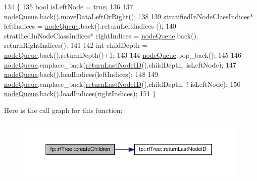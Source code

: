 \begin{DoxyCode}
134                                             \{
135                     \textcolor{keywordtype}{bool} isLeftNode = \textcolor{keyword}{true};
136 
137                         \hyperlink{classfp_1_1rfTree_af72d0a2f930fd480dfb4858885c2df23}{nodeQueue}.back().moveDataLeftOrRight();
138 
139                     stratifiedInNodeClassIndices* leftIndices = \hyperlink{classfp_1_1rfTree_af72d0a2f930fd480dfb4858885c2df23}{nodeQueue}.back().returnLeftIndices
      ();
140                     stratifiedInNodeClassIndices* rightIndices = \hyperlink{classfp_1_1rfTree_af72d0a2f930fd480dfb4858885c2df23}{nodeQueue}.back().
      returnRightIndices();
141 
142                     \textcolor{keywordtype}{int} childDepth = \hyperlink{classfp_1_1rfTree_af72d0a2f930fd480dfb4858885c2df23}{nodeQueue}.back().returnDepth()+1;
143 
144                     \hyperlink{classfp_1_1rfTree_af72d0a2f930fd480dfb4858885c2df23}{nodeQueue}.pop\_back();
145 
146                     \hyperlink{classfp_1_1rfTree_af72d0a2f930fd480dfb4858885c2df23}{nodeQueue}.emplace\_back(\hyperlink{classfp_1_1rfTree_a1b8c04f3f3ce362d9627c2ca66d10efd}{returnLastNodeID}(),childDepth, 
      isLeftNode);
147                     \hyperlink{classfp_1_1rfTree_af72d0a2f930fd480dfb4858885c2df23}{nodeQueue}.back().loadIndices(leftIndices);
148 
149                     \hyperlink{classfp_1_1rfTree_af72d0a2f930fd480dfb4858885c2df23}{nodeQueue}.emplace\_back(\hyperlink{classfp_1_1rfTree_a1b8c04f3f3ce362d9627c2ca66d10efd}{returnLastNodeID}(),childDepth, !
      isLeftNode);
150                     \hyperlink{classfp_1_1rfTree_af72d0a2f930fd480dfb4858885c2df23}{nodeQueue}.back().loadIndices(rightIndices);
151                 \}
\end{DoxyCode}
Here is the call graph for this function\+:
\nopagebreak
\begin{figure}[H]
\begin{center}
\leavevmode
\includegraphics[width=350pt]{classfp_1_1rfTree_ad226037e7f93c0fa2a1a960e19a87bed_cgraph}
\end{center}
\end{figure}
\mbox{\label{classfp_1_1rfTree_aaf9d8cdfbb1d10da53a375ea8204e393}} 
